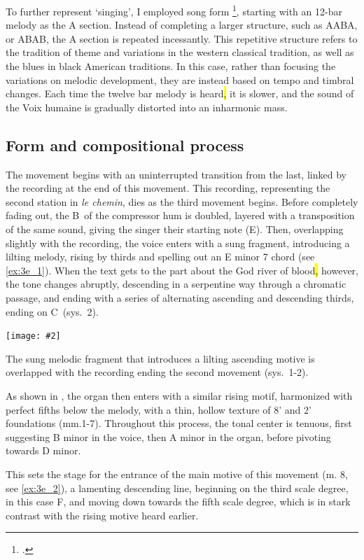 \documentclass[12pt,twoside,maitrise]{dms_ks}
\newcommand{\customincludeexamples}[4][]{%
    \begin{example}[H]
        \centering
        \texttt{[image: \#2]}
        \caption{#4}
	\label{#3} 
    \end{example}
}
\theoremstyle{definition}
\begin{document}
{To further represent `singing', I employed song form \footcite{owens_forms_2003}, starting with an 12-bar melody as the A section.
Instead of completing a larger structure, such as AABA, or ABAB, the A section is repeated incessantly.
This repetitive structure refers to the tradition of theme and variations in the western classical tradition, as well as the blues in black American traditions.  
In this case, rather than focusing the variations on melodic development, they are instead based on tempo and timbral changes. 
Each time the twelve bar melody is heard\hl{,} it is slower, and the sound of the Voix humaine is gradually distorted into an inharmonic mass.

\subsection{Form and compositional process}

The movement begins with an uninterrupted transition from the last, linked by the recording at the end of this movement. 
This recording, representing the second station in \textit{le chemin}, dies as the third movement begins. 
Before completely fading out, the B\na\ of the compressor hum is doubled, layered with a transposition of the same sound, giving the singer their starting note (E\na). 
Then, overlapping slightly with the recording, the voice enters with a sung fragment, introducing a lilting melody, rising by thirds and spelling out an E minor 7 chord (see \cref{ex:3e_1}). 
When the text gets to the part about the God river of blood\hl{,} however, the tone changes abruptly, descending in a serpentine way through a chromatic passage, and ending with a series of alternating ascending and descending thirds, ending on C\na\ (sys.~2).

\customincludeexamples[width=\textwidth]{3e_1}{ex:3e_1}{The sung melodic fragment that introduces a lilting ascending motive is overlapped with the recording ending the second movement (sys.~1-2).}

As shown in , the organ then enters with a similar rising motif, harmonized with perfect fifths below the melody, with a thin, hollow texture of 8' and 2' foundations (mm.1-7).
Throughout this process, the tonal center is tenuous, first suggesting B minor in the voice, then A minor in the organ, before pivoting towards D minor.  

This sets the stage for the entrance of the main motive of this movement (m. 8, see \cref{ex:3e_2}), a lamenting descending line, beginning on the third scale degree, in this case F, and moving down towards the fifth scale degree, which is in stark contrast with the rising motive heard earlier.  

}
\end{document}
